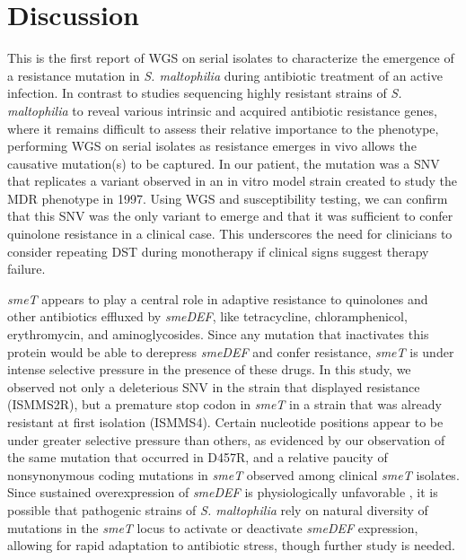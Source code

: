 \section{Discussion}

This is the first report of WGS on serial isolates to characterize the emergence of a resistance mutation in \emph{S. maltophilia} during antibiotic treatment of an active infection. In contrast to studies sequencing highly resistant strains of \emph{S. maltophilia} to reveal various intrinsic and acquired antibiotic resistance genes,\autocite{Crossman2008,Zhao2015} where it remains difficult to assess their relative importance to the phenotype, performing WGS on serial isolates as resistance emerges in vivo allows the causative mutation(s) to be captured. In our patient, the mutation was a SNV that replicates a variant observed in an in vitro model strain created to study the MDR phenotype in 1997.\autocite{Alonso1997} Using WGS and susceptibility testing, we can confirm that this SNV was the only variant to emerge and that it was sufficient to confer quinolone resistance in a clinical case. This underscores the need for clinicians to consider repeating DST during monotherapy if clinical signs suggest therapy failure.

\emph{smeT} appears to play a central role in adaptive resistance to quinolones and other antibiotics effluxed by \emph{smeDEF}, like tetracycline, chloramphenicol, erythromycin, and aminoglycosides. Since any mutation that inactivates this protein would be able to derepress \emph{smeDEF} and confer resistance, \emph{smeT} is under intense selective pressure in the presence of these drugs. In this study, we observed not only a deleterious SNV in the strain that displayed resistance (ISMMS2R), but a premature stop codon in \emph{smeT} in a strain that was already resistant at first isolation (ISMMS4). Certain nucleotide positions appear to be under greater selective pressure than others, as evidenced by our observation of the same mutation that occurred in D457R, and a relative paucity of nonsynonymous coding mutations in \emph{smeT} observed among clinical \emph{smeT} isolates.\autocite{Sanchez2004} Since sustained overexpression of \emph{smeDEF} is physiologically unfavorable \autocite{Alonso2004}, it is possible that pathogenic strains of \emph{S. maltophilia} rely on natural diversity of mutations in the \emph{smeT} locus to activate or deactivate \emph{smeDEF} expression, allowing for rapid adaptation to antibiotic stress, though further study is needed.

